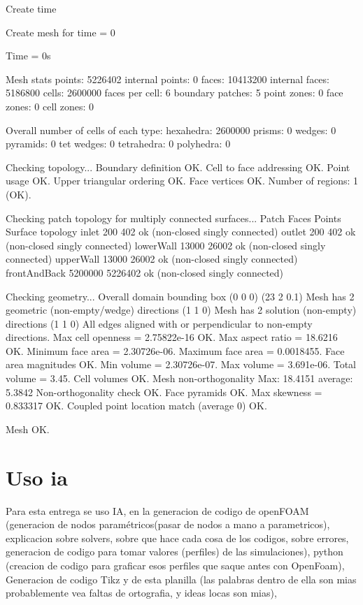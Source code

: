 \begin{terminal}
    Create time

Create mesh for time = 0

Time = 0s

Mesh stats
    points:           5226402
    internal points:  0
    faces:            10413200
    internal faces:   5186800
    cells:            2600000
    faces per cell:   6
    boundary patches: 5
    point zones:      0
    face zones:       0
    cell zones:       0

Overall number of cells of each type:
    hexahedra:     2600000
    prisms:        0
    wedges:        0
    pyramids:      0
    tet wedges:    0
    tetrahedra:    0
    polyhedra:     0

Checking topology...
    Boundary definition OK.
    Cell to face addressing OK.
    Point usage OK.
    Upper triangular ordering OK.
    Face vertices OK.
    Number of regions: 1 (OK).

Checking patch topology for multiply connected surfaces...
    Patch               Faces    Points   Surface topology                  
    inlet               200      402      ok (non-closed singly connected)  
    outlet              200      402      ok (non-closed singly connected)  
    lowerWall           13000    26002    ok (non-closed singly connected)  
    upperWall           13000    26002    ok (non-closed singly connected)  
    frontAndBack        5200000  5226402  ok (non-closed singly connected)  

Checking geometry...
    Overall domain bounding box (0 0 0) (23 2 0.1)
    Mesh has 2 geometric (non-empty/wedge) directions (1 1 0)
    Mesh has 2 solution (non-empty) directions (1 1 0)
    All edges aligned with or perpendicular to non-empty directions.
    Max cell openness = 2.75822e-16 OK.
    Max aspect ratio = 18.6216 OK.
    Minimum face area = 2.30726e-06. Maximum face area = 0.0018455.  Face area magnitudes OK.
    Min volume = 2.30726e-07. Max volume = 3.691e-06.  Total volume = 3.45.  Cell volumes OK.
    Mesh non-orthogonality Max: 18.4151 average: 5.3842
    Non-orthogonality check OK.
    Face pyramids OK.
    Max skewness = 0.833317 OK.
    Coupled point location match (average 0) OK.

Mesh OK.


\end{terminal}


\section{Uso ia}
Para esta entrega se uso IA, en la generacion de codigo de openFOAM (generacion de nodos paramétricos(pasar de nodos a mano a parametricos), explicacion sobre solvers, sobre que hace cada cosa de los codigos, sobre errores, generacion de codigo para tomar valores (perfiles) de las simulaciones), python (creacion de codigo para graficar esos perfiles que saque antes con OpenFoam), Generacion de codigo Tikz y de esta planilla (las palabras dentro de ella son mias probablemente vea faltas de ortografia, y ideas locas son mias), 